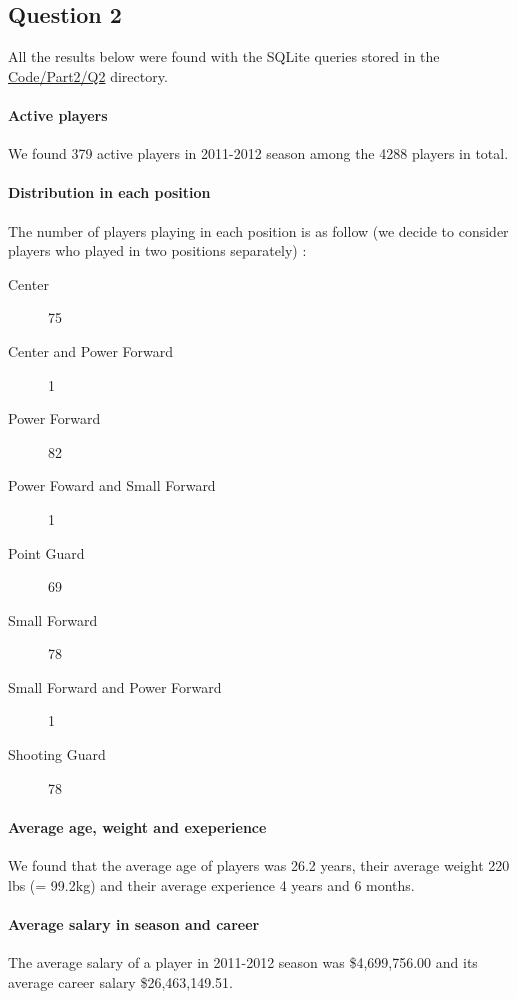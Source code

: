
\subsection{Question 2}
\label{subsec:412}
All the results below were found with the SQLite queries stored in the \url{Code/Part2/Q2} directory.
\paragraph{Active players}We found 379 active players in 2011-2012 season among the 4288 players in total.

\paragraph{Distribution in each position}
 The number of players playing in each position is as follow (we decide to consider players who played in two positions separately) :
 \begin{description}
	\item[Center]75
	\item[Center and Power Forward] 1
	\item[Power Forward]82
	\item[Power Foward and Small Forward] 1
	\item[Point Guard]69
	\item[Small Forward]78
	\item[Small Forward and Power Forward] 1
	\item[Shooting Guard]78
 \end{description}

\paragraph{Average age, weight and exeperience}
We found that the average age of players was 26.2 years, their average weight 220 lbs (= 99.2kg) and their average experience 4 years and 6 months.

\paragraph{Average salary in season and career}
The average salary of a player in 2011-2012 season was \$4,699,756.00 and its average career salary \$26,463,149.51.
